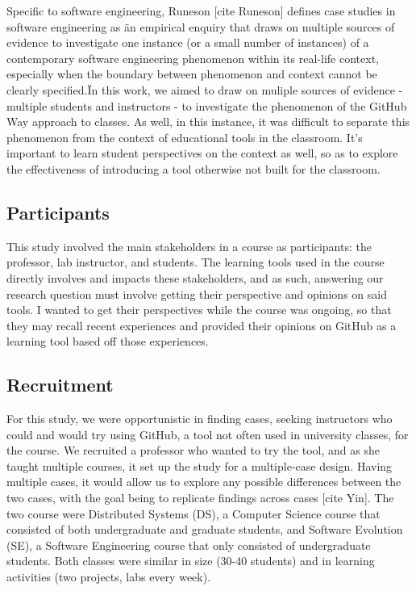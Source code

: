 Specific to software engineering, Runeson [cite Runeson] defines case studies in software engineering as \"an empirical enquiry that draws on multiple sources of evidence to investigate one instance (or a small number of instances) of a contemporary software engineering phenomenon within its real-life context, especially when the boundary between phenomenon and context cannot be clearly specified.\" In this work, we aimed to draw on muliple sources of evidence - multiple students and instructors - to investigate the phenomenon of the GitHub Way approach to classes. As well, in this instance, it was difficult to separate this phenomenon from the context of educational tools in the classroom. It's important to learn student perspectives on the context as well, so as to explore the effectiveness of introducing a tool otherwise not built for the classroom.

\subsection{Participants}
This study involved the main stakeholders in a course as participants: the professor, lab instructor, and students. The learning tools used in the course directly involves and impacts these stakeholders, and as such, answering our research question must involve getting their perspective and opinions on said tools. I wanted to get their perspectives while the course was ongoing, so that they may recall recent experiences and provided their opinions on GitHub as a learning tool based off those experiences.


\subsection{Recruitment}
For this study, we were opportunistic in finding cases, seeking instructors who could and would try using GitHub, a tool not often used in university classes, for the course. We recruited a professor who wanted to try the tool, and as she taught multiple courses, it set up the study for a multiple-case design. Having multiple cases, it would allow us to explore any possible differences between the two cases, with the goal being to replicate findings across cases [cite Yin]. The two course were Distributed Systems (DS), a Computer Science course that consisted of both undergraduate and graduate students, and Software Evolution (SE), a Software Engineering course that only consisted of undergraduate students. Both classes were similar in size (30-40 students) and in learning activities (two projects, labs every week).

